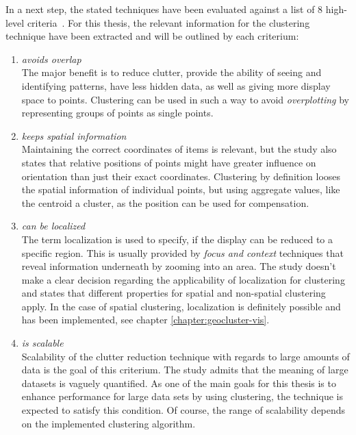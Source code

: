 In a next step, the stated techniques have been evaluated against a list of 8 high-level criteria~\cite{ellis08clutter}. For this thesis, the relevant information for the clustering technique have been extracted and will be outlined by each criterium:

\begin{enumerate}

\item \textit{avoids overlap}
\\ The major benefit is to reduce clutter, provide the ability of seeing and identifying patterns, have less hidden data, as well as giving more display space to points. Clustering can be used in such a way to avoid \textit{overplotting} by representing groups of points as single points.

\item \textit{keeps spatial information}
\\ Maintaining the correct coordinates of items is relevant, but the study also states that relative positions of points might have greater influence on orientation than just their exact coordinates. Clustering by definition looses the spatial information of individual points, but using aggregate values, like the centroid a cluster, as the position can be used for compensation. 

\item \textit{can be localized}
\\ The term localization is used to specify, if the display can be reduced to a specific region. This is usually provided by \textit{focus and context} techniques that reveal information underneath by zooming into an area. The study doesn't make a clear decision regarding the applicability of localization for clustering and states that different properties for spatial and non-spatial clustering apply. In the case of spatial clustering, localization is definitely possible and has been implemented, see chapter \ref{chapter:geocluster-vis}.  

\item \textit{is scalable}
\\ Scalability of the clutter reduction technique with regards to large amounts of data is the goal of this criterium. The study admits that the meaning of large datasets is vaguely quantified. As one of the main goals for this thesis is to enhance performance for large data sets by using clustering, the technique is expected to satisfy this condition. Of course, the range of scalability depends on the implemented clustering algorithm. 


\end{enumerate}
